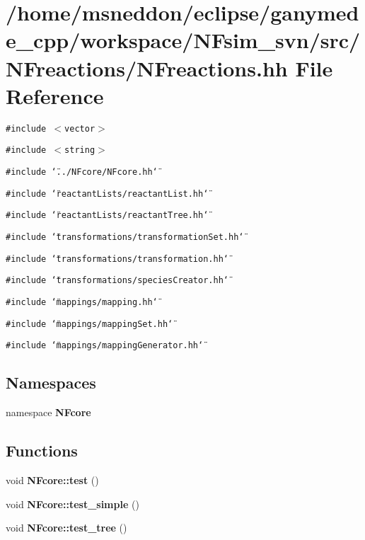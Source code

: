 \section{/home/msneddon/eclipse/ganymede\_\-cpp/workspace/NFsim\_\-svn/src/NFreactions/NFreactions.hh File Reference}
\label{NFreactions_8hh}


{\tt \#include $<$vector$>$}\par
{\tt \#include $<$string$>$}\par
{\tt \#include \char`\"{}../NFcore/NFcore.hh\char`\"{}}\par
{\tt \#include \char`\"{}reactantLists/reactantList.hh\char`\"{}}\par
{\tt \#include \char`\"{}reactantLists/reactantTree.hh\char`\"{}}\par
{\tt \#include \char`\"{}transformations/transformationSet.hh\char`\"{}}\par
{\tt \#include \char`\"{}transformations/transformation.hh\char`\"{}}\par
{\tt \#include \char`\"{}transformations/speciesCreator.hh\char`\"{}}\par
{\tt \#include \char`\"{}mappings/mapping.hh\char`\"{}}\par
{\tt \#include \char`\"{}mappings/mappingSet.hh\char`\"{}}\par
{\tt \#include \char`\"{}mappings/mappingGenerator.hh\char`\"{}}\par
\subsection*{Namespaces}
\begin{CompactItemize}
\item 
namespace {\bf NFcore}
\end{CompactItemize}
\subsection*{Functions}
\begin{CompactItemize}
\item 
void {\bf NFcore::test} ()
\item 
void {\bf NFcore::test\_\-simple} ()
\item 
void {\bf NFcore::test\_\-tree} ()
\end{CompactItemize}
